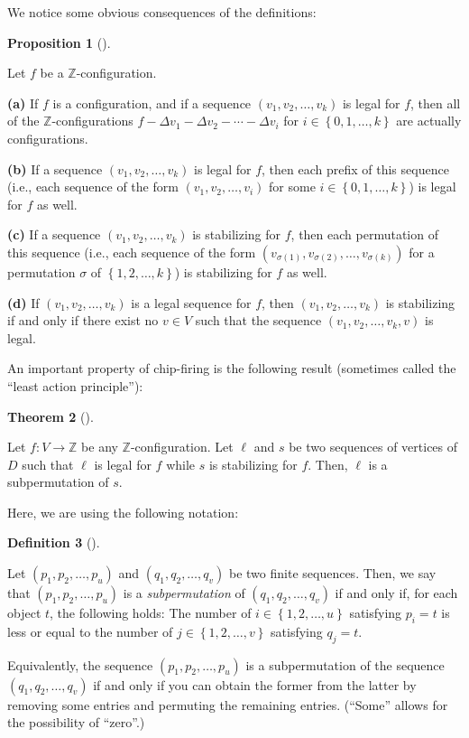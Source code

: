 \documentclass[numbers=enddot,12pt,final,onecolumn,notitlepage]{scrartcl}%
\theoremstyle{definition}
\newtheorem{theo}{Theorem}[section]
\newenvironment{theorem}[1][]
{\begin{theo}[#1]\begin{leftbar}}
{\end{leftbar}\end{theo}}
\newtheorem{prop}[theo]{Proposition}
\newenvironment{proposition}[1][]
{\begin{prop}[#1]\begin{leftbar}}
{\end{leftbar}\end{prop}}
\newtheorem{defi}[theo]{Definition}
\newenvironment{definition}[1][]
{\begin{defi}[#1]\begin{leftbar}}
{\end{leftbar}\end{defi}}
\newcommand{\ZZ}{\mathbb{Z}}
\newcommand{\set}[1]{\left\{ #1 \right\}}
\newcommand{\tup}[1]{\left( #1 \right)}
\begin{document}
We notice some obvious consequences of the definitions:

\begin{proposition} \label{prop.chip.obvious}
Let $f$ be a $\ZZ$-configuration.

\textbf{(a)}
 If $f$ is a configuration, and if
       a sequence $\tup{v_1, v_2, \ldots, v_k}$ is legal
       for $f$, then all of the
       $\ZZ$-configurations
       $f - \Delta v_1 - \Delta v_2 - \cdots - \Delta v_i$
       for $i \in \set{0, 1, \ldots, k}$ are actually
       configurations.

\textbf{(b)}
 If a sequence $\tup{v_1, v_2, \ldots, v_k}$ is legal
       for $f$, then each prefix of this
       sequence (i.e., each sequence of the form
       $\tup{v_1, v_2, \ldots, v_i}$ for some
       $i \in \set{0, 1, \ldots, k}$) is legal for $f$ as
       well.

\textbf{(c)}
  If a sequence $\tup{v_1, v_2, \ldots, v_k}$ is
       stabilizing for $f$, then each
       permutation of this sequence (i.e., each sequence of
       the form
       $\tup{v_{\sigma\tup{1}}, v_{\sigma\tup{2}}, \ldots,
             v_{\sigma\tup{k}}}$ for a permutation
       $\sigma$ of $\set{1, 2, \ldots, k}$) is stabilizing
       for $f$ as well.

\textbf{(d)}
  If $\tup{v_1, v_2, \ldots, v_k}$ is a legal sequence
       for $f$, then
       $\tup{v_1, v_2, \ldots, v_k}$ is stabilizing if and
       only if there exist no $v \in V$ such that the
       sequence $\tup{v_1, v_2, \ldots, v_k, v}$ is legal.
\end{proposition}

An important property of chip-firing is the following result
(sometimes called the ``least action principle''):

\begin{theorem} \label{thm.chip.lap}
Let $f : V \to \ZZ$ be any $\ZZ$-configuration.
Let $\ell$ and $s$ be two sequences of vertices of $D$ such
that $\ell$ is legal for $f$ while $s$ is stabilizing for $f$.
Then, $\ell$ is a subpermutation of $s$.
\end{theorem}

Here, we are using the following notation:

\begin{definition}
Let $\tup{p_1, p_2, \ldots, p_u}$ and
$\tup{q_1, q_2, \ldots, q_v}$ be two finite sequences.
Then, we say that $\tup{p_1, p_2, \ldots, p_u}$ is
a \textit{subpermutation} of $\tup{q_1, q_2, \ldots, q_v}$
if and only if, for each object $t$, the following holds:
The number of $i \in \set{1, 2, \ldots, u}$ satisfying
$p_i = t$ is less or equal to the number of
$j \in \set{1, 2, \ldots, v}$ satisfying $q_j = t$.

Equivalently, the sequence $\tup{p_1, p_2, \ldots, p_u}$ is
a subpermutation of the sequence $\tup{q_1, q_2, \ldots, q_v}$
if and only if you can obtain the former from the latter by
removing some entries and permuting the remaining entries.
(``Some'' allows for the possibility of ``zero''.)
\end{definition}
\end{document}
